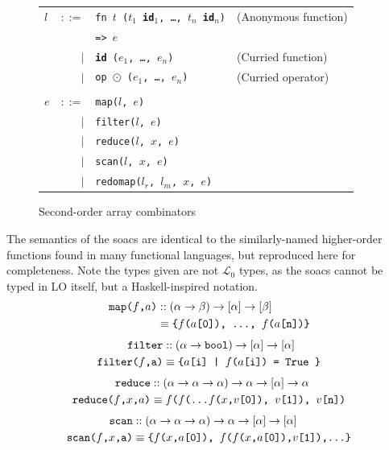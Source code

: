 \documentclass{sigplanconf}  %
\newcommand{\LO}{$\mathcal{L}_0$}
\begin{document}
\begin{figure}[bt]
\begin{tabular}{lrll}
$l$ & $::=$ & {\tt fn $t$ ($t_{1}$ {\bf id}$_{1}$, \ldots, $t_{n}$ {\bf id}$_{n}$)} & (Anonymous function) \\
&     & {\tt => $e$} \\
& $|$ & {\tt {\bf id} ($e_{1}$, \ldots, $e_{n}$)} & (Curried function) \\
& $|$ & {\tt op $\odot$ ($e_{1}$, \ldots, $e_{n}$)} & (Curried operator) \\
\\
$e$ & $::=$ & {\tt map($l$, $e$)} \\
    & $|$ & {\tt filter($l$, $e$)} \\
    & $|$ & {\tt reduce($l$, $x$, $e$)} \\
    & $|$ & {\tt scan($l$, $x$, $e$)} \\
    & $|$ & {\tt redomap($l_{r}$, $l_{m}$, $x$, $e$)} \\
\end{tabular}
\caption{Second-order array combinators}
\label{fig:soacs}
\end{figure}

The semantics of the {\sc soac}s are identical to the similarly-named
higher-order functions found in many functional languages, but
reproduced here for completeness.  Note the types given are not \LO{}
types, as the {\sc soac}s cannot be typed in LO{} itself, but a
Haskell-inspired notation.
\begin{align*}
\text{\tt map($f$,$a$)}
& :: (\alpha\rightarrow\beta)\rightarrow[\alpha]\rightarrow[\beta] \\
& \equiv \text{\tt\{$f$($a$[0]), \ldots, $f$($a$[n])\}}
\end{align*}
\begin{align*}
\text{\tt filter}
& :: (\alpha\rightarrow{\tt bool})\rightarrow[\alpha]\rightarrow[\alpha] \\
\text{\tt filter($f$,a)} & \equiv \text{\tt\{$a$[i] | $f$($a$[i]) = {\tt True }\}}
\end{align*}
\begin{align*}
\text{\tt reduce}
& :: (\alpha\rightarrow\alpha\rightarrow\alpha)\rightarrow\alpha\rightarrow[\alpha]\rightarrow\alpha \\
\text{\tt reduce($f$,$x$,$a$)} & \equiv \text{\tt $f$($f$(\ldots $f$($x$,$v$[0]), $v$[1]), $v$[n])}
\end{align*}
\begin{align*}
\text{\tt scan}
& :: (\alpha\rightarrow\alpha\rightarrow\alpha)\rightarrow\alpha\rightarrow[\alpha]\rightarrow[\alpha] \\
\text{\tt scan($f$,$x$,a)} & \equiv \text{\tt\{$f$($x$,$a$[0]), $f$($f$($x$,$a$[0]),$v$[1]),\ldots\}}
\end{align*}
\end{document}
